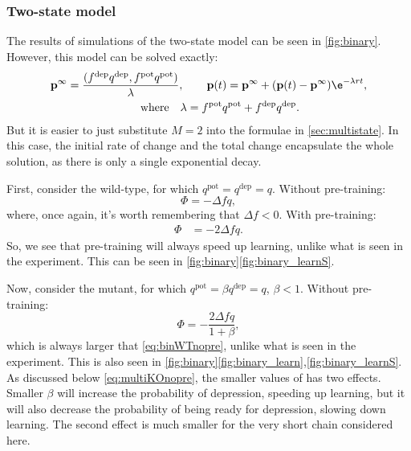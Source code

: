 \documentclass[12pt]{article}
\newcommand{\pr}{\mathbf{p}}
\newcommand{\eq}{\pr^\infty}
\newcommand{\pot}{^{\text{pot}}}
\newcommand{\dep}{^{\text{dep}}}
\begin{document}
\subsubsection{Two-state model}\label{sec:binary}




The results of simulations of the two-state model can be seen in \autoref{fig:binary}.
However, this model can be solved exactly:
%
\begin{multline}\label{eq:binarysol}
  \eq = \frac{(f\dep q\dep, f\pot q\pot)}{\lambda},
  \qquad
  \pr(t) = \eq + (\pr(t)-\eq)\e^{-\lambda rt},\\
  \qquad \text{where} \quad
  \lambda = f\pot q\pot + f\dep q\dep.
\end{multline}
%
But it is easier to just substitute $M=2$ into the formulae in \autoref{sec:multistate}.
In this case, the initial rate of change and the total change encapsulate the whole solution, as there is only a single exponential decay.

First, consider the wild-type, for which $q\pot=q\dep=q$.
Without pre-training:
%
\begin{equation}\label{eq:binWTnopre}
  \Phi = -\Delta f q,
\end{equation}
%
where, once again, it's worth remembering that $\Delta f<0$.
With pre-training:
%
\begin{equation}\label{eq:binWTpre}
\begin{aligned}
  \Phi &= -2\Delta f q.
\end{aligned}
\end{equation}
%
So, we see that pre-training will always speed up learning, unlike what is seen in the experiment.
This can be seen in \autoref{fig:binary}\ref{fig:binary_learnS}.

Now, consider the mutant, for which $q\pot=\beta q\dep=q$, $\beta<1$.
Without pre-training:
%
\begin{equation}\label{eq:binKOnopre}
  \Phi = -\frac{2\Delta f q}{1+\beta},
\end{equation}
%
which is always larger that \eqref{eq:binWTnopre}, unlike what is seen in the experiment.
This is also seen in \autoref{fig:binary}\ref{fig:binary_learn},\ref{fig:binary_learnS}.
As discussed below \eqref{eq:multiKOnopre}, the smaller values of has two effects.
Smaller $\beta$ will increase the probability of depression, speeding up learning, but it will also decrease the probability of being ready for depression, slowing down learning.
The second effect is much smaller for the very short chain considered here.
\end{document}
